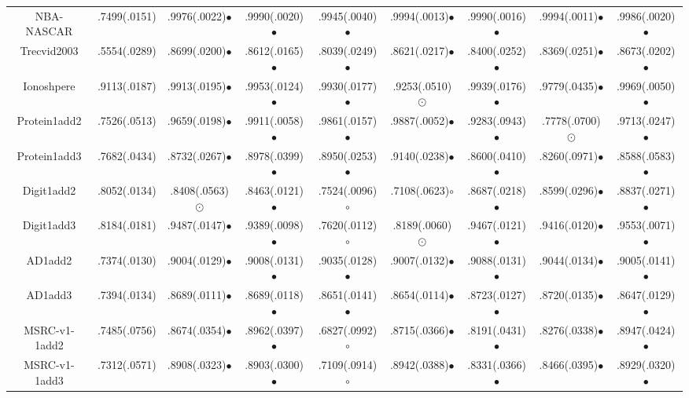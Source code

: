 \documentclass[10pt,journal,compsoc]{IEEEtran}
\begin{document}
\begin{table*}[!t]
{\begin{tabular}{c|| c c c c c c c c }
NBA-NASCAR      & .7499(.0151) & .9976(.0022)$\bullet$  & .9990(.0020)$\bullet$  & .9945(.0040)$\bullet$  & .9994(.0013)$\bullet$  & .9990(.0016)$\bullet$ & .9994(.0011)$\bullet$  & .9986(.0020)$\bullet$ \\
Trecvid2003     & .5554(.0289) & .8699(.0200)$\bullet$  & .8612(.0165)$\bullet$  & .8039(.0249)$\bullet$  & .8621(.0217)$\bullet$  & .8400(.0252)$\bullet$  & .8369(.0251)$\bullet$  & .8673(.0202)$\bullet$ \\
Ionoshpere      & .9113(.0187) & .9913(.0195)$\bullet$ & .9953(.0124)$\bullet$ & .9930(.0177)$\bullet$ & .9253(.0510){\tiny $\odot$} & .9939(.0176)$\bullet$ & .9779(.0435)$\bullet$ & .9969(.0050)$\bullet$\\
Protein1add2    & .7526(.0513) & .9659(.0198)$\bullet$ & .9911(.0058)$\bullet$ & .9861(.0157)$\bullet$ & .9887(.0052)$\bullet$ & .9283(.0943)$\bullet$ & .7778(.0700){\tiny $\odot$} & .9713(.0247)$\bullet$\\
Protein1add3    & .7682(.0434) & .8732(.0267)$\bullet$ & .8978(.0399)$\bullet$ & .8950(.0253)$\bullet$ & .9140(.0238)$\bullet$ & .8600(.0410)$\bullet$ & .8260(.0971)$\bullet$ & .8588(.0583)$\bullet$ \\
Digit1add2      & .8052(.0134) & .8408(.0563){\tiny $\odot$} & .8463(.0121)$\bullet$ & .7524(.0096)$\circ$ & .7108(.0623)$\circ$ & .8687(.0218)$\bullet$ & .8599(.0296)$\bullet$ & .8837(.0271)$\bullet$ \\
Digit1add3      & .8184(.0181) & .9487(.0147)$\bullet$ & .9389(.0098)$\bullet$ & .7620(.0112)$\circ$ & .8189(.0060){\tiny $\odot$} & .9467(.0121)$\bullet$ & .9416(.0120)$\bullet$ & .9553(.0071)$\bullet$\\
AD1add2         & .7374(.0130) & .9004(.0129)$\bullet$ & .9008(.0131)$\bullet$ & .9035(.0128)$\bullet$ & .9007(.0132)$\bullet$ & .9088(.0131)$\bullet$ & .9044(.0134)$\bullet$ & .9005(.0141)$\bullet$ \\
AD1add3         & .7394(.0134) & .8689(.0111)$\bullet$ & .8689(.0118)$\bullet$ & .8651(.0141)$\bullet$ & .8654(.0114)$\bullet$ & .8723(.0127)$\bullet$ & .8720(.0135)$\bullet$ & .8647(.0129)$\bullet$ \\
MSRC-v1-1add2   & .7485(.0756) & .8674(.0354)$\bullet$ & .8962(.0397)$\bullet$ & .6827(.0992)$\circ$ & .8715(.0366)$\bullet$ & .8191(.0431)$\bullet$ & .8276(.0338)$\bullet$ & .8947(.0424)$\bullet$ \\
MSRC-v1-1add3   & .7312(.0571) & .8908(.0323)$\bullet$ & .8903(.0300)$\bullet$ & .7109(.0914)$\circ$ & .8942(.0388)$\bullet$ & .8331(.0366)$\bullet$ & .8466(.0395)$\bullet$ & .8929(.0320)$\bullet$ \\

\end{tabular}}
\end{table*}
\end{document}
